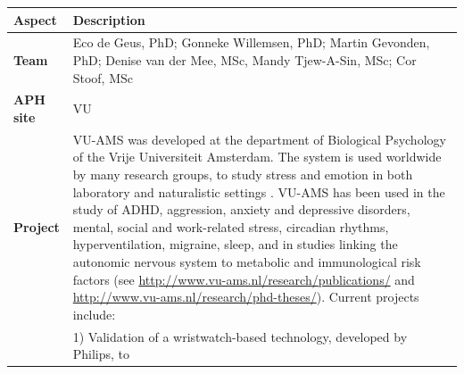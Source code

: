 \documentclass[]{book}
\begin{document}
\begin{longtable}[]{@{}ll@{}}
\toprule
\begin{minipage}[b]{0.25\columnwidth}\raggedright\strut
\textbf{Aspect}\strut
\end{minipage} & \begin{minipage}[b]{0.69\columnwidth}\raggedright\strut
\textbf{Description}\strut
\end{minipage}\tabularnewline
\midrule
\endhead
\begin{minipage}[t]{0.25\columnwidth}\raggedright\strut
\textbf{Team}\strut
\end{minipage} & \begin{minipage}[t]{0.69\columnwidth}\raggedright\strut
Eco de Geus, PhD; Gonneke Willemsen, PhD; Martin Gevonden, PhD; Denise
van der Mee, MSc, Mandy Tjew-A-Sin, MSc; Cor Stoof, MSc\strut
\end{minipage}\tabularnewline
\begin{minipage}[t]{0.25\columnwidth}\raggedright\strut
\textbf{APH site}\strut
\end{minipage} & \begin{minipage}[t]{0.69\columnwidth}\raggedright\strut
VU\strut
\end{minipage}\tabularnewline
\begin{minipage}[t]{0.25\columnwidth}\raggedright\strut
\textbf{Project}\strut
\end{minipage} & \begin{minipage}[t]{0.69\columnwidth}\raggedright\strut
VU-AMS was developed at the department of Biological Psychology of the
Vrije Universiteit Amsterdam. The system is used worldwide by many
research groups, to study stress and emotion in both laboratory and
naturalistic settings \citep{DeGeus1995, Geus1996, Willemsen1996}.
VU-AMS has been used in the study of ADHD, aggression, anxiety and
depressive disorders, mental, social and work-related stress, circadian
rhythms, hyperventilation, migraine, sleep, and in studies linking the
autonomic nervous system to metabolic and immunological risk factors
(see \url{http://www.vu-ams.nl/research/publications/} and
\url{http://www.vu-ams.nl/research/phd-theses/}). Current projects
include:\strut
\end{minipage}\tabularnewline
\begin{minipage}[t]{0.25\columnwidth}\raggedright\strut
\strut
\end{minipage} & \begin{minipage}[t]{0.69\columnwidth}\raggedright\strut
1) Validation of a wristwatch-based technology, developed by Philips, to

\end{minipage}
\end{longtable}
\end{document}

